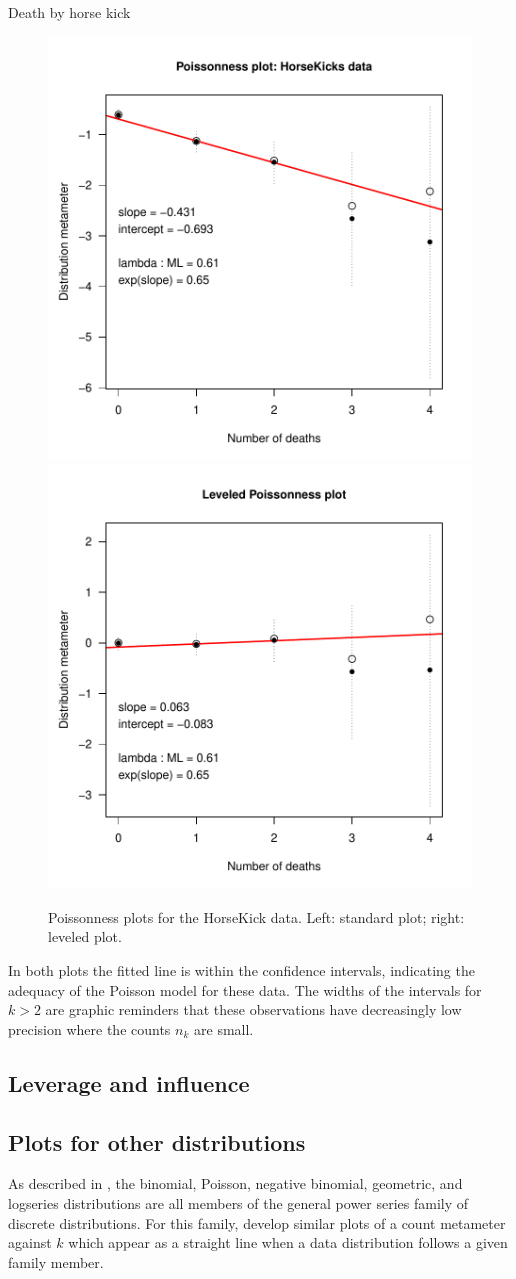 \documentclass[11pt]{book}\usepackage[]{graphicx}\usepackage[]{color}
\begin{document}
\begin{Example}[horsekick3]{Death by horse kick}
\begin{figure}[htbp]
\centerline{
\includegraphics[width=.48\textwidth]{ch03/fig/distplot1} 
\includegraphics[width=.48\textwidth]{ch03/fig/distplot2}
}
\caption[Poissonness plots for the HorseKick data]{Poissonness plots for the HorseKick data. Left: standard plot; right: leveled plot.\label{fig:distplot1}}
\end{figure}
In both plots the fitted line is within the confidence intervals,
indicating the adequacy of the Poisson model for these data.
The widths of the intervals for $k > 2$ are graphic reminders that these observations
have decreasingly low precision where the counts $n_k$ are small.

\end{Example}

\subsection{Leverage and influence}


\subsection{Plots for other distributions}\label{sec:discrete-other}
As described in , the binomial, Poisson, negative binomial,
geometric, and logseries distributions are all members of the
general  power series family of discrete distributions.
For this family, \citet{HoaglinTukey:85} develop similar plots
of a count metameter against $k$ which appear as a straight line
when a data distribution follows a given family member.
\end{document}
